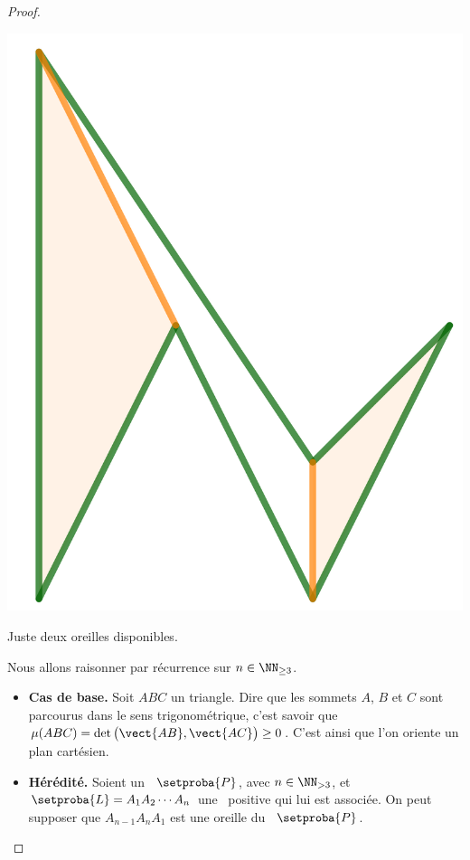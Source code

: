 \begin{proof}
\begin{multicols}{2}
    	\begin{center}
        	\includegraphics[scale=.4]{content/polygon/sufficient-cond/mini-ear-2.png}
        
        	\smallskip
       		Juste deux oreilles disponibles.
    	\end{center}
    \end{multicols}
    
    
	Nous allons raisonner par récurrence sur $n \in \NN_{\geq3}$.
	
	\begin{itemize}
		\item \textbf{Cas de base.} 
		Soit $ABC$ un triangle. Dire que les sommets $A$, $B$ et $C$ sont parcourus dans le sens trigonométrique, c'est savoir que $\mu(ABC) = \det \big( \vect{AB} , \vect{AC} \big) \geq 0$. C'est ainsi que l'on oriente un plan cartésien.


		\item \textbf{Hérédité.} 
		Soient un \ngone\ $\setproba{P}$, avec $n \in \NN_{>3}$, et $\setproba{L} = A_1 A_2 \cdots A_n$ une \nline\ positive qui lui est associée. On peut supposer que $A_{n-1} A_n A_1$ est une oreille du \ngone\ $\setproba{P}$.



\end{itemize}
\end{proof}

